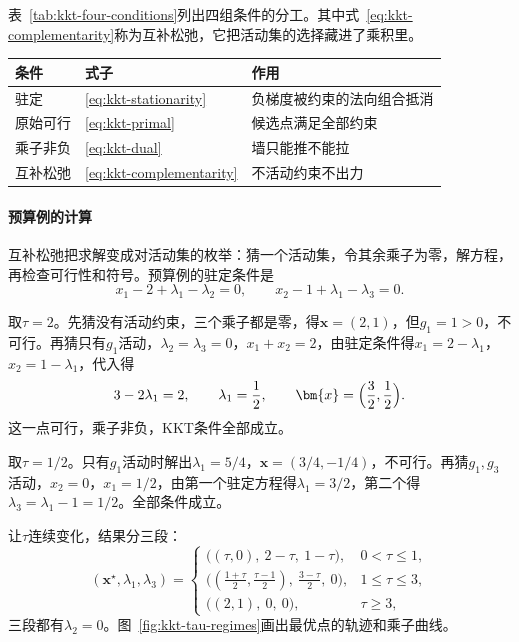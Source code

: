 表~\ref{tab:kkt-four-conditions}列出四组条件的分工。其中式~\eqref{eq:kkt-complementarity}称为互补松弛，它把活动集的选择藏进了乘积里。

\begin{BookInlineTable}
  \centering
  \begin{tabular}{@{}lll@{}}
    \toprule
    条件 & 式子 & 作用\\
    \midrule
    驻定 & \eqref{eq:kkt-stationarity} & 负梯度被约束的法向组合抵消\\
    原始可行 & \eqref{eq:kkt-primal} & 候选点满足全部约束\\
    乘子非负 & \eqref{eq:kkt-dual} & 墙只能推不能拉\\
    互补松弛 & \eqref{eq:kkt-complementarity} & 不活动约束不出力\\
    \bottomrule
  \end{tabular}
  \caption{KKT条件的四个组成部分。}
  \label{tab:kkt-four-conditions}
\end{BookInlineTable}

\paragraph{预算例的计算}
互补松弛把求解变成对活动集的枚举：猜一个活动集，令其余乘子为零，解方程，再检查可行性和符号。预算例的驻定条件是
\[
 x_1-2+\lambda_1-\lambda_2=0,\qquad x_2-1+\lambda_1-\lambda_3=0.
\]

取$\tau=2$。先猜没有活动约束，三个乘子都是零，得$\bm{x}=(2,1)$，但$g_1=1>0$，不可行。再猜只有$g_1$活动，$\lambda_2=\lambda_3=0$，$x_1+x_2=2$，由驻定条件得$x_1=2-\lambda_1$，$x_2=1-\lambda_1$，代入得
\[
 3-2\lambda_1=2,\qquad\lambda_1=\frac12,\qquad\bm{x}=\Bigl(\frac32,\frac12\Bigr).
\]
这一点可行，乘子非负，KKT条件全部成立。

取$\tau=1/2$。只有$g_1$活动时解出$\lambda_1=5/4$，$\bm{x}=(3/4,-1/4)$，不可行。再猜$g_1,g_3$活动，$x_2=0$，$x_1=1/2$，由第一个驻定方程得$\lambda_1=3/2$，第二个得$\lambda_3=\lambda_1-1=1/2$。全部条件成立。

让$\tau$连续变化，结果分三段：
\begin{equation}
 (\bm{x}^\star,\lambda_1,\lambda_3)=\begin{cases}
 \bigl((\tau,0),\ 2-\tau,\ 1-\tau\bigr),&0<\tau\leq1,\\
 \bigl((\tfrac{1+\tau}{2},\tfrac{\tau-1}{2}),\ \tfrac{3-\tau}{2},\ 0\bigr),&1\leq\tau\leq3,\\
 \bigl((2,1),\ 0,\ 0\bigr),&\tau\geq3,
 \end{cases}
 \label{eq:kkt-budget-solution}
\end{equation}
三段都有$\lambda_2=0$。图~\ref{fig:kkt-tau-regimes}画出最优点的轨迹和乘子曲线。

